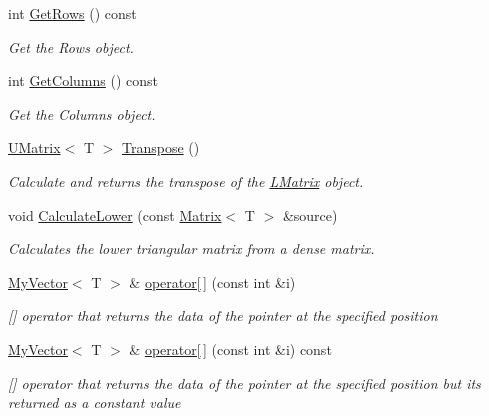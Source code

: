 \begin{DoxyCompactItemize}
int \mbox{\hyperlink{class_l_matrix_ad4ed9d329dbd01d010504a97b3879442}{Get\+Rows}} () const
\begin{DoxyCompactList}\small\item\em Get the Rows object. \end{DoxyCompactList}\item 
int \mbox{\hyperlink{class_l_matrix_ae7adc0f92e3648751fe49852ad158ea2}{Get\+Columns}} () const
\begin{DoxyCompactList}\small\item\em Get the Columns object. \end{DoxyCompactList}\item 
\mbox{\hyperlink{class_u_matrix}{U\+Matrix}}$<$ T $>$ \mbox{\hyperlink{class_l_matrix_afe89d1c0c91d284ff0277da586dc667a}{Transpose}} ()
\begin{DoxyCompactList}\small\item\em Calculate and returns the transpose of the \mbox{\hyperlink{class_l_matrix}{L\+Matrix}} object. \end{DoxyCompactList}\item 
void \mbox{\hyperlink{class_l_matrix_a9a70080e771867dd76c983fe1f8c2c15}{Calculate\+Lower}} (const \mbox{\hyperlink{class_matrix}{Matrix}}$<$ T $>$ \&source)
\begin{DoxyCompactList}\small\item\em Calculates the lower triangular matrix from a dense matrix. \end{DoxyCompactList}\item 
\mbox{\hyperlink{class_my_vector}{My\+Vector}}$<$ T $>$ \& \mbox{\hyperlink{class_l_matrix_a7eab2a6c57437448d21a04484844e359}{operator\mbox{[}$\,$\mbox{]}}} (const int \&i)
\begin{DoxyCompactList}\small\item\em \mbox{[}\mbox{]} operator that returns the data of the pointer at the specified position \end{DoxyCompactList}\item 
\mbox{\hyperlink{class_my_vector}{My\+Vector}}$<$ T $>$ \& \mbox{\hyperlink{class_l_matrix_a56ec5ba9be0bb900ddc0ee7c5283bccd}{operator\mbox{[}$\,$\mbox{]}}} (const int \&i) const
\begin{DoxyCompactList}\small\item\em \mbox{[}\mbox{]} operator that returns the data of the pointer at the specified position but its returned as a constant value \end{DoxyCompactList}\item 

\end{DoxyCompactItemize}
